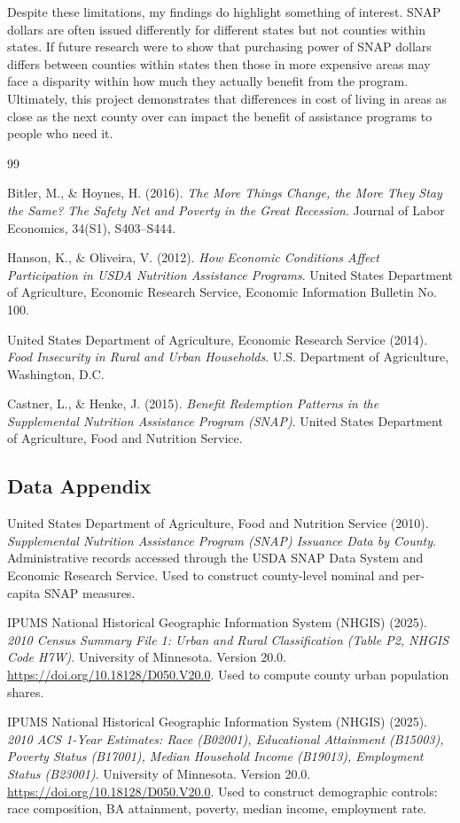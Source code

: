 \documentclass{article}
\begin{document}
Despite these limitations, my findings do highlight something of interest. SNAP dollars are often issued differently for different states but not counties within states. If future research were to show that purchasing power of SNAP dollars differs between counties within states then those in more expensive areas may face a disparity within how much they actually benefit from the program. Ultimately, this project demonstrates that differences in cost of living in areas as close as the next county over can impact the benefit of assistance programs to people who need it. 
\newpage
\begin{thebibliography}{99}

Bitler, M., \& Hoynes, H. (2016).
\textit{The More Things Change, the More They Stay the Same? The Safety Net and Poverty in the Great Recession}.
Journal of Labor Economics, 34(S1), S403–S444.

Hanson, K., \& Oliveira, V. (2012).
\textit{How Economic Conditions Affect Participation in USDA Nutrition Assistance Programs}.
United States Department of Agriculture, Economic Research Service, Economic Information Bulletin No. 100.

United States Department of Agriculture, Economic Research Service (2014).
\textit{Food Insecurity in Rural and Urban Households}.
U.S. Department of Agriculture, Washington, D.C.

Castner, L., \& Henke, J. (2015).
\textit{Benefit Redemption Patterns in the Supplemental Nutrition Assistance Program (SNAP)}.
United States Department of Agriculture, Food and Nutrition Service.

\subsection*{Data Appendix}

United States Department of Agriculture, Food and Nutrition Service (2010).
\textit{Supplemental Nutrition Assistance Program (SNAP) Issuance Data by County}.
Administrative records accessed through the USDA SNAP Data System and Economic Research Service.
Used to construct county-level nominal and per-capita SNAP measures.

IPUMS National Historical Geographic Information System (NHGIS) (2025).
\textit{2010 Census Summary File 1: Urban and Rural Classification (Table P2, NHGIS Code H7W)}.
University of Minnesota. Version 20.0. \url{https://doi.org/10.18128/D050.V20.0}.
Used to compute county urban population shares.

IPUMS National Historical Geographic Information System (NHGIS) (2025).
\textit{2010 ACS 1-Year Estimates: Race (B02001), Educational Attainment (B15003), Poverty Status (B17001),
Median Household Income (B19013), Employment Status (B23001)}.
University of Minnesota. Version 20.0. \url{https://doi.org/10.18128/D050.V20.0}.
Used to construct demographic controls: race composition, BA attainment, poverty, median income, employment rate.

\end{thebibliography}
\end{document}
